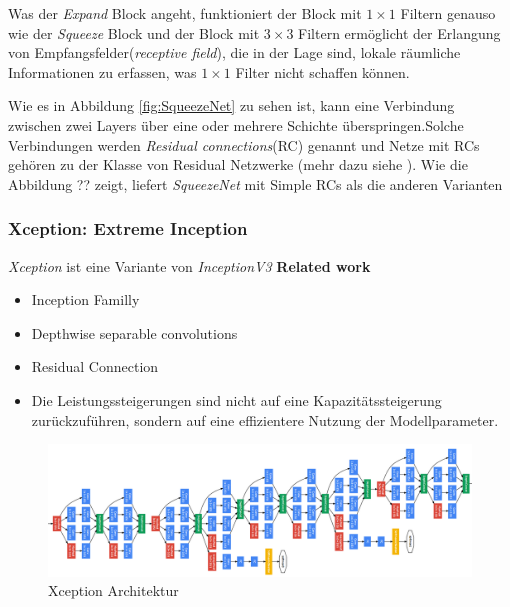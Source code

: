 \documentclass[12pt,a4paper]{scrartcl}
\numberwithin{equation}{section}
\begin{document}
Was der \textit{Expand} Block angeht, funktioniert der Block mit $ 1\times1 $ Filtern genauso wie der \textit{Squeeze} Block und der Block mit $ 3\times3 $ Filtern ermöglicht der Erlangung von Empfangsfelder(\textit{receptive field}), die in der Lage sind, lokale räumliche Informationen zu erfassen, was $ 1\times1 $ Filter nicht schaffen können.

Wie es in Abbildung \ref{fig:SqueezeNet} zu sehen ist, kann eine Verbindung zwischen zwei Layers über eine oder mehrere Schichte überspringen.Solche Verbindungen werden \textit{Residual connections}(RC) genannt und Netze mit RCs gehören zu der Klasse von Residual Netzwerke (mehr dazu siehe \cite{ResNet}).
Wie die Abbildung ?? zeigt, liefert \textit{SqueezeNet} mit Simple RCs  als die anderen Varianten

\subsubsection{Xception: Extreme Inception}
\textit{Xception} ist eine Variante von \textit{InceptionV3}
\textbf{Related work}
\begin{itemize}
	\item Inception Familly
	\item Depthwise separable convolutions
	\item Residual Connection
	\item Die Leistungssteigerungen sind nicht auf eine Kapazitätssteigerung zurückzuführen, sondern auf eine effizientere Nutzung der Modellparameter.
	
\end{itemize}
\begin{figure}[h]
	\centering
	\includegraphics[width=\textwidth ]{Xception}
	\caption{ Xception Architektur}
	\label{fig:Xception}
\end{figure}
\end{document}
